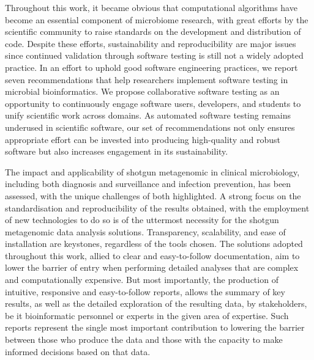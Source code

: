 Throughout this work, it became obvious that computational algorithms have become an essential component of microbiome research, with great efforts by the scientific community to raise standards on the development and distribution of code. Despite these efforts, sustainability and reproducibility are major issues since continued validation through software testing is still not a widely adopted practice. In an effort to uphold good software engineering practices, we report seven recommendations that help researchers implement software testing in microbial bioinformatics. We propose collaborative software testing as an opportunity to continuously engage software users, developers, and students to unify scientific work across domains. As automated software testing remains underused in scientific software, our set of recommendations not only ensures appropriate effort can be invested into producing high-quality and robust software but also increases engagement in its sustainability. 

The impact and applicability of shotgun metagenomic in clinical microbiology, including both diagnosis and surveillance and infection prevention, has been assessed, with the unique challenges of both highlighted. A strong focus on the standardisation and reproducibility of the results obtained, with the employment of new technologies to do so is of the uttermost necessity for the shotgun metagenomic data analysis solutions. Transparency, scalability, and ease of installation are keystones, regardless of the tools chosen. The solutions adopted throughout this work, allied to clear and easy-to-follow documentation, aim to lower the barrier of entry when performing detailed analyses that are complex and computationally expensive. But most importantly, the production of intuitive, responsive and easy-to-follow reports, allows the summary of key results, as well as the detailed exploration of the resulting data, by stakeholders, be it bioinformatic personnel or experts in the given area of expertise. Such reports represent the single most important contribution to lowering the barrier between those who produce the data and those with the capacity to make informed decisions based on that data. 